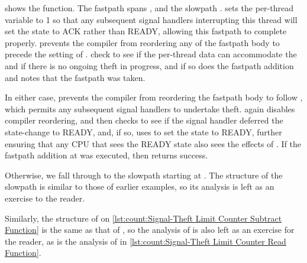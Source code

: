 \begin{fcvref}
shows the  function.
The fastpath spans , and the slowpath
.
 sets the per-thread  variable to 1 so that
any subsequent signal handlers interrupting this thread will
set the  state to ACK rather than READY, allowing this
fastpath to complete properly.
 prevents the compiler from reordering any of the fastpath body
to precede the setting of .
 check to see
if the per-thread data can accommodate
the  and if there is no ongoing theft in progress,
and if so  does the fastpath addition and
 notes that
the fastpath was taken.

In either case,  prevents the compiler from reordering the
fastpath body to follow , which permits any subsequent signal
handlers to undertake theft.
 again disables compiler reordering, and then
checks to see if the signal handler deferred the 
state-change to READY, and, if so,  uses
 to set the  state to
READY, further ensuring that
any CPU that sees the READY state also sees the effects
of .
If the fastpath addition at  was executed, then
 returns
success.
\end{fcvref}

\begin{listing}

\caption{Signal-Theft Limit Counter Read Function}
\label{lst:count:Signal-Theft Limit Counter Read Function}
\end{listing}

\begin{fcvref}
Otherwise, we fall through to the slowpath starting at .
The structure of the slowpath is similar to those of earlier examples,
so its analysis is left as an exercise to the reader.
\end{fcvref}
Similarly, the structure of  on
\cref{lst:count:Signal-Theft Limit Counter Subtract Function}
is the same
as that of , so the analysis of  is also
left as an exercise for the reader, as is the analysis of
 in
\cref{lst:count:Signal-Theft Limit Counter Read Function}.

